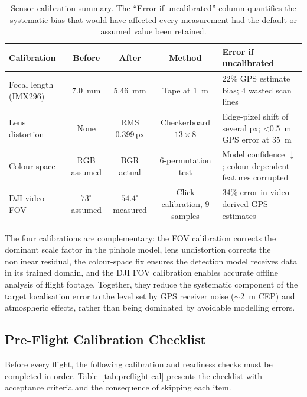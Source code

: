 \begin{table}[ht]
\centering
\caption{Sensor calibration summary. The ``Error if uncalibrated'' column quantifies the systematic bias that would have affected every measurement had the default or assumed value been retained.}
\label{tab:calibration}
\renewcommand{\arraystretch}{1.25}
\begin{tabular}{@{}p{2.8cm}cccp{4.2cm}@{}}
\toprule
\textbf{Calibration} & \textbf{Before} & \textbf{After} & \textbf{Method} & \textbf{Error if uncalibrated} \\
\midrule
Focal length (IMX296) & \SI{7.0}{\milli\metre} & \SI{5.46}{\milli\metre} & Tape at \SI{1}{\metre} & 22\% GPS estimate bias; 4 wasted scan lines \\
Lens distortion & None & RMS 0.399\,px & Checkerboard $13{\times}8$ & Edge-pixel shift of several px; \SI{<0.5}{\metre} GPS error at \SI{35}{\metre} \\
Colour space & RGB assumed & BGR actual & 6-permutation test & Model confidence $\downarrow$; colour-dependent features corrupted \\
DJI video FOV & $73^{\circ}$ assumed & $54.4^{\circ}$ measured & Click calibration, 9 samples & 34\% error in video-derived GPS estimates \\
\bottomrule
\end{tabular}
\end{table}

The four calibrations are complementary: the FOV calibration corrects the dominant scale factor in the pinhole model, lens undistortion corrects the nonlinear residual, the colour-space fix ensures the detection model receives data in its trained domain, and the DJI FOV calibration enables accurate offline analysis of flight footage. Together, they reduce the systematic component of the target localisation error to the level set by GPS receiver noise ($\sim$\SI{2}{\metre} CEP) and atmospheric effects, rather than being dominated by avoidable modelling errors.

\subsection{Pre-Flight Calibration Checklist}\label{sec:cal:checklist}

Before every flight, the following calibration and readiness checks must be completed in order. Table~\ref{tab:preflight-cal} presents the checklist with acceptance criteria and the consequence of skipping each item.

